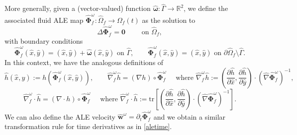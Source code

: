 \documentclass[11pt]{article}
\newcommand{\bd}{\boldsymbol}
\def\R{{\mathbb R}}
\theoremstyle{definition}
\begin{document}
More generally, given a (vector-valued) function $\hat{\bd{\omega}}: \hat{\Gamma} \to \R^{2}$, we define the associated fluid ALE map $\hat{\bd{\Phi}}^{\omega}_{f}: \hat{\Omega}_{f} \to \Omega_{f}(t)$ as the solution to 
\begin{equation}\label{alef1}
\Delta \hat{\bd{\Phi}}^{\omega}_{f} = \bd{0} \qquad \text{ on } \hat{\Omega}_{f},
\end{equation}
with boundary conditions
\begin{equation}\label{alef2}
\hat{\bd{\Phi}}^{\omega}_{f}(\hat{x}, \hat{y}) = (\hat{x}, \hat{y}) + \hat{\bd{\omega}}(\hat{x}, \hat{y}) \text{ on } \hat{\Gamma}, \qquad \hat{\bd{\Phi}}^{\omega}_{f}(\hat{x}, \hat{y}) = (\hat{x}, \hat{y}) \text{ on } \partial \hat{\Omega}_{f} \setminus \hat{\Gamma}.
\end{equation}
In this context, we have the analogous definitions of
\begin{equation*}
\hat{h}(\hat{x}, \hat{y}) := h(\hat{\bd{\Phi}}^{\omega}_{f}(\hat{x}, \hat{y})), \qquad \hat{\nabla}^{\omega}_{f}\hat{h} = (\nabla h) \circ \hat{\bd{\Phi}}^{\omega}_{f} \quad \text{ where } \hat{\nabla}^{\omega}_{f}\hat{h} := \left(\frac{\partial \hat{h}}{\partial \hat{x}}, \frac{\partial \hat{h}}{\partial \hat{y}}\right) \cdot \left(\hat{\nabla} \hat{\bd{\Phi}}^{\omega}_{f}\right)^{-1},
\end{equation*}
\begin{equation}\label{omegadiff}
\hat{\nabla}^{\omega}_{f} \cdot \hat{h} = (\nabla \cdot h) \circ \hat{\bd{\Phi}}^{\omega}_{f} \quad \text{ where } \hat{\nabla}^{\omega}_{f} \cdot \hat{h} := \text{tr}\left[\left(\frac{\partial \hat{h}}{\partial \hat{x}}, \frac{\partial \hat{h}}{\partial \hat{y}}\right) \cdot \left(\hat{\nabla} \hat{\bd{\Phi}}^{\omega}_{f}\right)^{-1}\right].
\end{equation}
We can also define the ALE velocity $\hat{\bd{w}}^{\omega} = \partial_{t}\hat{\bd{\Phi}}^{\omega}_{f}$ and we obtain a similar transformation rule for time derivatives as in \eqref{aletime}.
\end{document}
